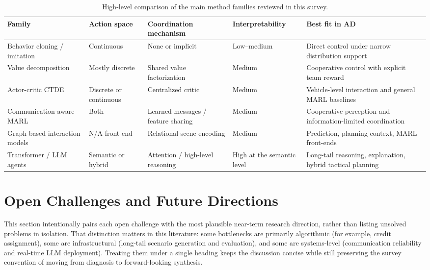 \documentclass[12pt, a4paper]{article}
\begin{document}
\begin{table}[ht]
\centering
\caption{High-level comparison of the main method families reviewed in this survey.
\label{tab:families}}
\renewcommand{\arraystretch}{1.15}
\small
\begin{tabular}{p{2.7cm}p{2.0cm}p{2.0cm}p{2.2cm}p{5.0cm}}
\toprule
\textbf{Family} & \textbf{Action space} & \textbf{Coordination mechanism} & \textbf{Interpretability} & \textbf{Best fit in AD} \\
\midrule
Behavior cloning / imitation \cite{bojarski2016end,bansal2018chauffeur,codevilla2018end} & Continuous & None or implicit & Low--medium & Direct control under narrow distribution support \\
Value decomposition \cite{sunehag2018value,rashid2018qmix,son2019qtran} & Mostly discrete & Shared value factorization & Medium & Cooperative control with explicit team reward \\
Actor-critic CTDE \cite{lowe2017multi,foerster2018counterfactual,yu2021surprising,peng2021facmac} & Discrete or continuous & Centralized critic & Medium & Vehicle-level interaction and general MARL baselines \\
Communication-aware MARL \cite{sukhbaatar2016learning,das2019tarmac,wang2020v2vnet} & Both & Learned messages / feature sharing & Medium & Cooperative perception and information-limited coordination \\
Graph-based interaction models \cite{gao2020vectornet,liang2020lanegcn,salzmann2020trajectron} & N/A front-end & Relational scene encoding & Medium & Prediction, planning context, MARL front-ends \\
Transformer / LLM agents \cite{wen2022multi,wen2023dilu,mao2023gpt,sha2023languagempc} & Semantic or hybrid & Attention / high-level reasoning & High at the semantic level & Long-tail reasoning, explanation, hybrid tactical planning \\
\bottomrule
\end{tabular}
\end{table}

\section{Open Challenges and Future Directions}
\label{sec:challenges}

This section intentionally pairs each open challenge with the most plausible
near-term research direction, rather than listing unsolved problems in
isolation. That distinction matters in this literature: some bottlenecks are
primarily algorithmic (for example, credit assignment), some are infrastructural
(long-tail scenario generation and evaluation), and some are systems-level
(communication reliability and real-time LLM deployment). Treating them under a
single heading keeps the discussion concise while still preserving the survey
convention of moving from diagnosis to forward-looking synthesis.
\end{document}
